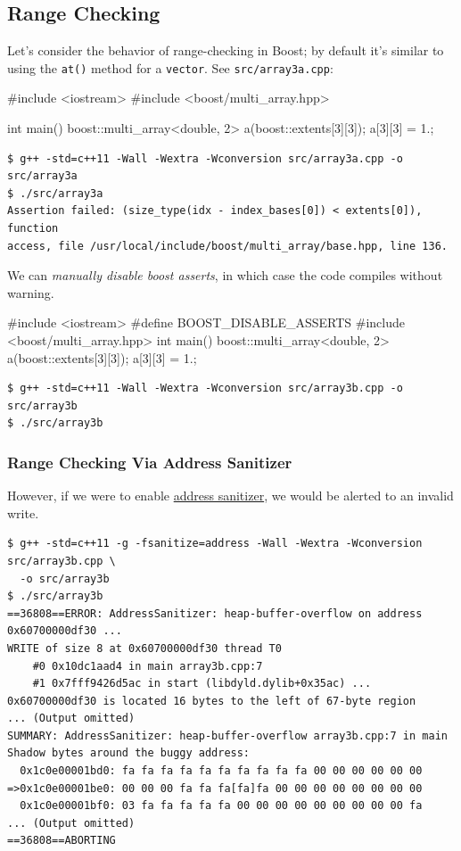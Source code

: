\documentclass[12pt,letterpaper,twoside]{article}
\begin{document}
\subsection{Range Checking} Let's consider the behavior of range-checking in Boost; by default
it's similar to using the \texttt{at()} method for a \texttt{vector}. See
\texttt{src/array3a.cpp}:

\begin{cpp}
#include <iostream>
#include <boost/multi_array.hpp>

int main() {
  boost::multi_array<double, 2> a(boost::extents[3][3]);
  a[3][3] = 1.;
}
\end{cpp}

{\small
\begin{verbatim}
$ g++ -std=c++11 -Wall -Wextra -Wconversion src/array3a.cpp -o src/array3a
$ ./src/array3a
Assertion failed: (size_type(idx - index_bases[0]) < extents[0]), function
access, file /usr/local/include/boost/multi_array/base.hpp, line 136.
\end{verbatim}
}

We can \emph{manually disable boost asserts}, in which case
the code compiles without warning.
\begin{cpp}
#include <iostream>
#define BOOST_DISABLE_ASSERTS
#include <boost/multi_array.hpp>
int main() {
  boost::multi_array<double, 2> a(boost::extents[3][3]);
  a[3][3] = 1.;
}
\end{cpp}

{\small
\begin{verbatim}
$ g++ -std=c++11 -Wall -Wextra -Wconversion src/array3b.cpp -o src/array3b
$ ./src/array3b
\end{verbatim}
}

\subsubsection{Range Checking Via Address Sanitizer}
However, if we were to enable 
\href{https://en.wikipedia.org/wiki/AddressSanitizer}{address sanitizer}, 
we would be alerted to an invalid write.

{\small
\begin{verbatim}
$ g++ -std=c++11 -g -fsanitize=address -Wall -Wextra -Wconversion src/array3b.cpp \
  -o src/array3b
$ ./src/array3b
==36808==ERROR: AddressSanitizer: heap-buffer-overflow on address 0x60700000df30 ...
WRITE of size 8 at 0x60700000df30 thread T0
    #0 0x10dc1aad4 in main array3b.cpp:7
    #1 0x7fff9426d5ac in start (libdyld.dylib+0x35ac) ...
0x60700000df30 is located 16 bytes to the left of 67-byte region
... (Output omitted)
SUMMARY: AddressSanitizer: heap-buffer-overflow array3b.cpp:7 in main
Shadow bytes around the buggy address:
  0x1c0e00001bd0: fa fa fa fa fa fa fa fa fa fa 00 00 00 00 00 00
=>0x1c0e00001be0: 00 00 00 fa fa fa[fa]fa 00 00 00 00 00 00 00 00
  0x1c0e00001bf0: 03 fa fa fa fa fa 00 00 00 00 00 00 00 00 00 fa
... (Output omitted)
==36808==ABORTING
\end{verbatim}
}
\end{document}
